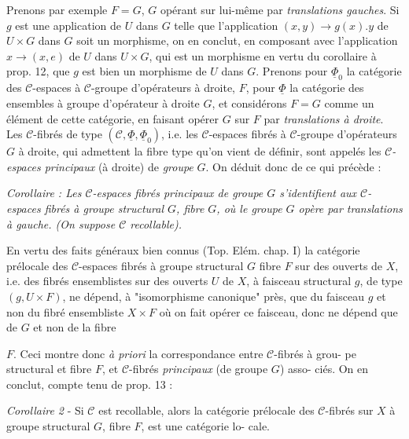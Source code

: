 Prenons par exemple $F=G$, $G$ opérant sur lui-même par \emph{translations gauches}. Si $g$ est une application de $U$ dans $G$ telle que l'application $(x,y) \to g(x).y$ de $U \times G$ dans $G$ soit un morphisme, on en conclut, en composant avec l'application $x \to (x,e)$ de $U$ dans $U \times G$, qui est un morphisme en vertu du corollaire à prop. 12, que $g$ est bien un morphisme de $U$ dans $G$. Prenons pour $\underline{\Phi}_0$ la catégorie des $\mathcal{C}$-espaces à $\mathcal{C}$-groupe d'opérateurs à droite, $F$, pour $\underline{\Phi}$ la catégorie des ensembles à groupe d'opérateur à droite $G$, et considérons $F=G$ comme un élément de cette catégorie, en faisant opérer $G$ sur $F$ par \emph{translations à droite}. Les $\mathcal{C}$-fibrés de type $(\mathcal{C}, \underline{\Phi}, \underline{\Phi}_0)$, i.e. les $\mathcal{C}$-espaces fibrés à $\mathcal{C}$-groupe d'opérateurs $G$ à droite, qui admettent la fibre type qu'on vient de définir, sont appelés les \emph{$\mathcal{C}$-espaces principaux} (à droite) de \emph{groupe} $G$. On déduit donc de ce qui précède :

\emph{Corollaire : Les $\mathcal{C}$-espaces fibrés principaux de groupe $G$ s'identifient aux $\mathcal{C}$-espaces fibrés à groupe structural $G$, fibre $G$, où le groupe $G$ opère par translations à gauche. (On suppose $\mathcal{C}$ recollable).}

En vertu des faits généraux bien connus (Top. Elém. chap. I) la catégorie prélocale des $\mathcal{C}$-espaces fibrés à groupe structural $G$ fibre $F$ sur des ouverts de $X$, i.e. des fibrés ensemblistes sur des ouverts $U$ de $X$, à faisceau structural $g$, de type $(g, U \times F)$, ne dépend, à "isomorphisme canonique" près, que du faisceau $g$ et non du fibré ensembliste $X \times F$ où on fait opérer ce faisceau, donc ne dépend que de $G$ et non de la fibre

\newpage



$F$. Ceci montre donc \emph{à priori} la correspondance entre $\mathcal{C}$-fibrés à grou-
pe structural et fibre $F$, et $\mathcal{C}$-fibrés \emph{principaux} (de groupe $G$) asso-
ciés. On en conclut, compte tenu de prop. 13 :

\emph{Corollaire 2} - Si $\mathcal{C}$ est recollable, alors la catégorie prélocale des
$\mathcal{C}$-fibrés sur $X$ à groupe structural $G$, fibre $F$, est une catégorie lo-
cale.

